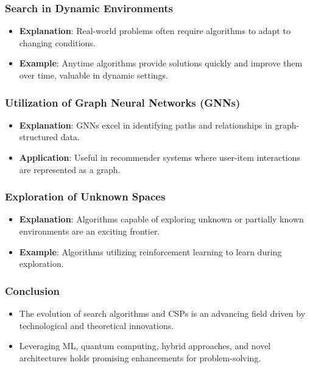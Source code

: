 \documentclass[aspectratio=169]{beamer}
\begin{document}
\begin{frame}[fragile]
    \frametitle{Search in Dynamic Environments}
    \begin{itemize}
        \item \textbf{Explanation}: Real-world problems often require algorithms to adapt to changing conditions.
        \item \textbf{Example}: Anytime algorithms provide solutions quickly and improve them over time, valuable in dynamic settings.
    \end{itemize}
\end{frame}

\begin{frame}[fragile]
    \frametitle{Utilization of Graph Neural Networks (GNNs)}
    \begin{itemize}
        \item \textbf{Explanation}: GNNs excel in identifying paths and relationships in graph-structured data.
        \item \textbf{Application}: Useful in recommender systems where user-item interactions are represented as a graph.
    \end{itemize}
\end{frame}

\begin{frame}[fragile]
    \frametitle{Exploration of Unknown Spaces}
    \begin{itemize}
        \item \textbf{Explanation}: Algorithms capable of exploring unknown or partially known environments are an exciting frontier.
        \item \textbf{Example}: Algorithms utilizing reinforcement learning to learn during exploration.
    \end{itemize}
\end{frame}

\begin{frame}[fragile]
    \frametitle{Conclusion}
    \begin{itemize}
        \item The evolution of search algorithms and CSPs is an advancing field driven by technological and theoretical innovations.
        \item Leveraging ML, quantum computing, hybrid approaches, and novel architectures holds promising enhancements for problem-solving.
    \end{itemize}
\end{frame}
\end{document}
